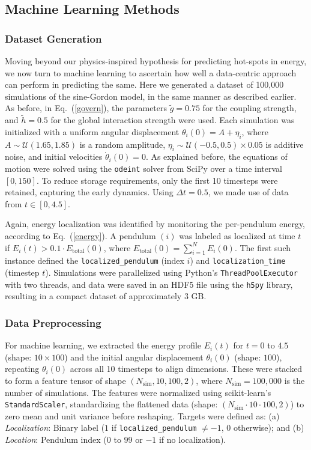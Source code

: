 \documentclass[11pt]{article}
\begin{document}
\subsection{Machine Learning Methods}
\subsubsection*{Dataset Generation}
Moving beyond our physics-inspired hypothesis for predicting hot-spots in energy, we now turn to machine learning to ascertain how well a data-centric approach can perform in predicting the same. Here we generated a dataset of 100,000 simulations of the sine-Gordon model, in the same manner as described earlier. 
As before, in Eq.~(\ref{govern}), the parameters $\tilde{g} = 0.75$ for the coupling strength, and $\tilde{h} = 0.5$ for the global interaction strength were used. Each simulation was initialized with a uniform angular displacement $\theta_i(0) = A + \eta_i$, where $A \sim \mathcal{U}(1.65, 1.85)$ is a random amplitude, $\eta_i \sim \mathcal{U}(-0.5, 0.5) \times 0.05$ is additive noise, and initial velocities $\dot{\theta}_i(0) = 0$. As explained before, the equations of motion were solved using the \texttt{odeint} solver from SciPy over a time interval $[0, 150]$. To reduce storage requirements, only the first 10 timesteps were retained, capturing the early dynamics. Using $\Delta t = 0.5$, we made use of data from $t\in [0, 4.5]$. 

Again, energy localization was identified by monitoring the per-pendulum energy, according to Eq.~(\ref{energy}). A pendulum $(i)$ was labeled as localized at time $t$ if $E_i(t) > 0.1 \cdot E_{\text{total}}(0)$, where $E_{\text{total}}(0) = \sum_{i=1}^{N} E_i(0)$. The first such instance defined the \texttt{localized\_pendulum} (index $i$) and \texttt{localization\_time} (timestep $t$). Simulations were parallelized using Python’s \texttt{ThreadPoolExecutor} with two threads, and data were saved in an HDF5 file using the \texttt{h5py} library, resulting in a compact dataset of approximately 3 GB.


\subsubsection*{Data Preprocessing}
For machine learning, we extracted the energy profile $E_i(t)$ for $t = 0$ to $4.5$ (shape: $10 \times 100$) and the initial angular displacement $\theta_i(0)$ (shape: $100$), repeating $\theta_i(0)$ across all 10 timesteps to align dimensions. These were stacked to form a feature tensor of shape $(N_{\text{sim}}, 10, 100, 2)$, where $N_{\text{sim}} = 100,000$ is the number of simulations. The features were normalized using scikit-learn’s \texttt{StandardScaler}, standardizing the flattened data (shape: $(N_{\text{sim}} \cdot 10 \cdot 100, 2)$) to zero mean and unit variance before reshaping. Targets were defined as: (a) {\it Localization}: Binary label ($1$ if \texttt{localized\_pendulum} $\neq -1$, $0$ otherwise); and (b) {\it Location}: Pendulum index ($0$ to $99$ or $-1$ if no localization).
\end{document}
